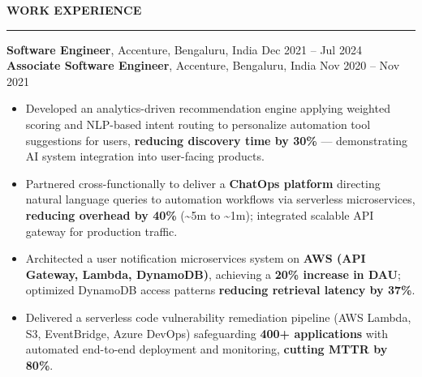 \documentclass[letterpaper,10.5pt]{extarticle}
\newcommand{\resumesection}[1]{%
    \vspace{6pt}%
    \noindent\textbf{#1}\vspace{-5pt}%
    \\\noindent\rule{\textwidth}{0.5pt}%
    \vspace{1pt}%
}
\begin{document}
\resumesection{WORK EXPERIENCE}

\noindent\textbf{Software Engineer}, Accenture, Bengaluru, India \hfill Dec 2021 -- Jul 2024\\
\textbf{Associate Software Engineer}, Accenture, Bengaluru, India \hfill Nov 2020 -- Nov 2021

\begin{itemize}[leftmargin=12pt, topsep=1pt, itemsep=0pt, parsep=0pt]
    \item Developed an analytics-driven recommendation engine applying weighted scoring and NLP-based intent routing to personalize automation tool suggestions for users, \textbf{reducing discovery time by 30\%} --- demonstrating AI system integration into user-facing products.
    \item Partnered cross-functionally to deliver a \textbf{ChatOps platform} directing natural language queries to automation workflows via serverless microservices, \textbf{reducing overhead by 40\%} (\textasciitilde5m to \textasciitilde1m); integrated scalable API gateway for production traffic.
    \item Architected a user notification microservices system on \textbf{AWS (API Gateway, Lambda, DynamoDB)}, achieving a \textbf{20\% increase in DAU}; optimized DynamoDB access patterns \textbf{reducing retrieval latency by 37\%}.
    \item Delivered a serverless code vulnerability remediation pipeline (AWS Lambda, S3, EventBridge, Azure DevOps) safeguarding \textbf{400+ applications} with automated end-to-end deployment and monitoring, \textbf{cutting MTTR by 80\%}.
\end{itemize}
\end{document}
